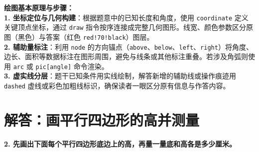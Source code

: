 \documentclass[12pt, a4paper]{ctexrep}
\begin{document}
{\small\color{blue!70!black}
\textbf{绘图基本原理与步骤：}\\
\textbf{1. 坐标定位与几何构建}：根据题意中的已知长度和角度，使用 \texttt{coordinate} 定义关键顶点坐标，通过 \texttt{draw} 指令按序连接成完整几何图形。线宽、颜色参数区分原图（黑色）与答案（红色 \texttt{red!70!black}）图层。\\
\textbf{2. 辅助量标注}：利用 \texttt{node} 的方向锚点（\texttt{above}、\texttt{below}、\texttt{left}、\texttt{right}）将角度、边长、面积等数据标注在图形周围，避免与线条或其他标注重叠。若涉及角弧则使用 \texttt{arc} 或 \texttt{pic[angle]} 命令渲染。\\
\textbf{3. 虚实线分层}：题干已知条件用实线绘制，解答新增的辅助线或操作痕迹用 \texttt{dashed} 虚线或彩色加粗线标识，确保读者一眼区分原有信息与作答内容。
}


\newpage

\section{解答：画平行四边形的高并测量}

\vspace{0.4cm}

\noindent\textbf{2. 先画出下面每个平行四边形底边上的高，再量一量底和高各是多少厘米。}

\vspace{0.8cm}
\end{document}
